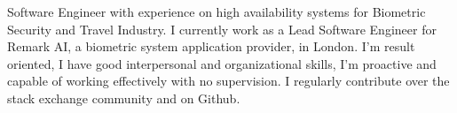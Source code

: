 

\begin{cvparagraph}

Software Engineer with experience on high availability systems for Biometric Security and Travel Industry.
I currently work as a Lead Software Engineer for Remark AI, a biometric system application provider, in London.
I’m result oriented, I have good interpersonal and organizational skills, I'm proactive and capable of working effectively with
no supervision.
I regularly contribute over the stack exchange community and on Github.
\end{cvparagraph}

